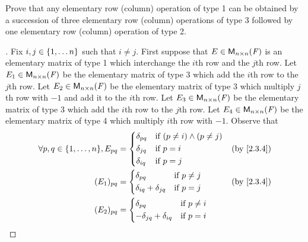 \begin{ex}\label{ex:3.1.9}
	Prove that any elementary row (column) operation of type 1 can be obtained by a succession of three elementary row (column) operations of type 3 followed by one elementary row (column) operation of type 2.
\end{ex}

\begin{proof}[]
	Fix \(i, j \in \left\lbrace1, \dots n\right\rbrace\) such that \(i \neq j\).
	First suppose that \(E \in \ms[n][n][\F]\) is an elementary matrix of type 1 which interchange the \(i\)th row and the \(j\)th row.
	Let \(E_1 \in \ms[n][n][\F]\) be the elementary matrix of type 3 which add the \(i\)th row to the \(j\)th row.
	Let \(E_2 \in \ms[n][n][\F]\) be the elementary matrix of type 3 which multiply \(j\)th row with \(-1\) and add it to the \(i\)th row.
	Let \(E_3 \in \ms[n][n][\F]\) be the elementary matrix of type 3 which add the \(i\)th row to the \(j\)th row.
	Let \(E_4 \in \ms[n][n][\F]\) be the elementary matrix of type 4 which multiply \(i\)th row with \(-1\).
	Observe that
	\begin{align*}
		\forall p, q \in \set{1, \dots, n}, E_{p q} & = \begin{dcases}
			                                                \delta_{p q} & \text{if } (p \neq i) \land (p \neq j) \\
			                                                \delta_{j q} & \text{if } p = i                       \\
			                                                \delta_{i q} & \text{if } p = j
		                                                \end{dcases} &  & \by{2.3.4} \\
		(E_1)_{p q}                                 & = \begin{dcases}
			                                                \delta_{p q}                & \text{if } p \neq j \\
			                                                \delta_{i q} + \delta_{j q} & \text{if } p = j
		                                                \end{dcases}     &  & \by{2.3.4}     \\
		(E_2)_{p q}                                 & = \begin{dcases}
			                                                \delta_{p q}                 & \text{if } p \neq i \\
			                                                -\delta_{j q} + \delta_{i q} & \text{if } p = i

\end{dcases}
\end{align*}
\end{proof}

